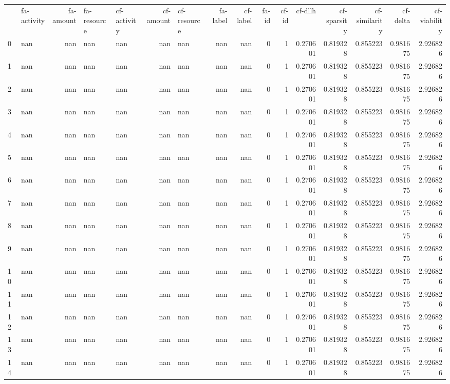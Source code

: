 \begin{tabular}{llrllrlrrrrrrrrr}
 & fa-activity & fa-amount & fa-resource & cf-activity & cf-amount & cf-resource & fa-label & cf-label & fa-id & cf-id & cf-dllh & cf-sparsity & cf-similarity & cf-delta & cf-viability \\
0 & nan & nan & nan & nan & nan & nan & nan & nan & 0 & 1 & 0.270601 & 0.819328 & 0.855223 & 0.981675 & 2.926826 \\
1 & nan & nan & nan & nan & nan & nan & nan & nan & 0 & 1 & 0.270601 & 0.819328 & 0.855223 & 0.981675 & 2.926826 \\
2 & nan & nan & nan & nan & nan & nan & nan & nan & 0 & 1 & 0.270601 & 0.819328 & 0.855223 & 0.981675 & 2.926826 \\
3 & nan & nan & nan & nan & nan & nan & nan & nan & 0 & 1 & 0.270601 & 0.819328 & 0.855223 & 0.981675 & 2.926826 \\
4 & nan & nan & nan & nan & nan & nan & nan & nan & 0 & 1 & 0.270601 & 0.819328 & 0.855223 & 0.981675 & 2.926826 \\
5 & nan & nan & nan & nan & nan & nan & nan & nan & 0 & 1 & 0.270601 & 0.819328 & 0.855223 & 0.981675 & 2.926826 \\
6 & nan & nan & nan & nan & nan & nan & nan & nan & 0 & 1 & 0.270601 & 0.819328 & 0.855223 & 0.981675 & 2.926826 \\
7 & nan & nan & nan & nan & nan & nan & nan & nan & 0 & 1 & 0.270601 & 0.819328 & 0.855223 & 0.981675 & 2.926826 \\
8 & nan & nan & nan & nan & nan & nan & nan & nan & 0 & 1 & 0.270601 & 0.819328 & 0.855223 & 0.981675 & 2.926826 \\
9 & nan & nan & nan & nan & nan & nan & nan & nan & 0 & 1 & 0.270601 & 0.819328 & 0.855223 & 0.981675 & 2.926826 \\
10 & nan & nan & nan & nan & nan & nan & nan & nan & 0 & 1 & 0.270601 & 0.819328 & 0.855223 & 0.981675 & 2.926826 \\
11 & nan & nan & nan & nan & nan & nan & nan & nan & 0 & 1 & 0.270601 & 0.819328 & 0.855223 & 0.981675 & 2.926826 \\
12 & nan & nan & nan & nan & nan & nan & nan & nan & 0 & 1 & 0.270601 & 0.819328 & 0.855223 & 0.981675 & 2.926826 \\
13 & nan & nan & nan & nan & nan & nan & nan & nan & 0 & 1 & 0.270601 & 0.819328 & 0.855223 & 0.981675 & 2.926826 \\
14 & nan & nan & nan & nan & nan & nan & nan & nan & 0 & 1 & 0.270601 & 0.819328 & 0.855223 & 0.981675 & 2.926826 \\

\end{tabular}
